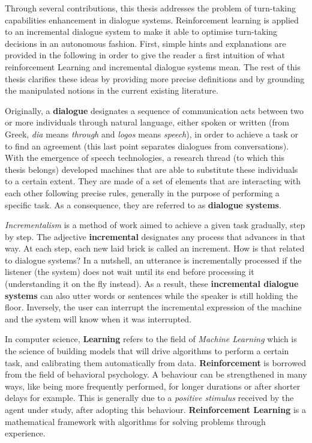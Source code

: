 				Through several contributions, this thesis addresses the problem of turn-taking capabilities enhancement in dialogue systems. Reinforcement learning is applied to an incremental dialogue system to make it able to optimise turn-taking decisions in an autonomous fashion. First, simple hints and explanations are provided in the following in order to give the reader a first intuition of what reinforcement Learning and incremental dialogue systems mean. The rest of this thesis clarifies these ideas by providing more precise definitions and by grounding the manipulated notions in the current existing literature.

        Originally, a \textbf{dialogue} designates a sequence of communication acts between two or more individuals through natural language, either spoken or written (from Greek, \textit{dia} means \textit{through} and \textit{logos} means \textit{speech}), in order to achieve a task or to find an agreement (this last point separates dialogues from conversations). With the emergence of speech technologies, a research thread (to which this thesis belongs) developed machines that are able to substitute these individuals to a certain extent. They are made of a set of elements that are interacting with each other following precise rules, generally in the purpose of performing a specific task. As a consequence, they are referred to as \textbf{dialogue systems}.

        \textit{Incrementalism} is a method of work aimed to achieve a given task gradually, step by step. The adjective \textbf{incremental} designates any process that advances in that way. At each step, each new laid brick is called an increment. How is that related to dialogue systems? In a nutshell, an utterance is incrementally processed if the listener (the system) does not wait until its end before processing it (understanding it on the fly instead). As a result, these \textbf{incremental dialogue systems} can also utter words or sentences while the speaker is still holding the floor. Inversely, the user can interrupt the incremental expression of the machine and the system will know when it was interrupted.

        In computer science, \textbf{Learning} refers to the field of \textit{Machine Learning} which is the science of building models that will drive algorithms to perform a certain task, and calibrating them automatically from data. \textbf{Reinforcement} is borrowed from the field of behavioral psychology. A behaviour can be strengthened in many ways, like being more frequently performed, for longer durations or after shorter delays for example. This is generally due to a \textit{positive stimulus} received by the agent under study, after adopting this behaviour. \textbf{Reinforcement Learning} is a mathematical framework with algorithms for solving problems through experience.

